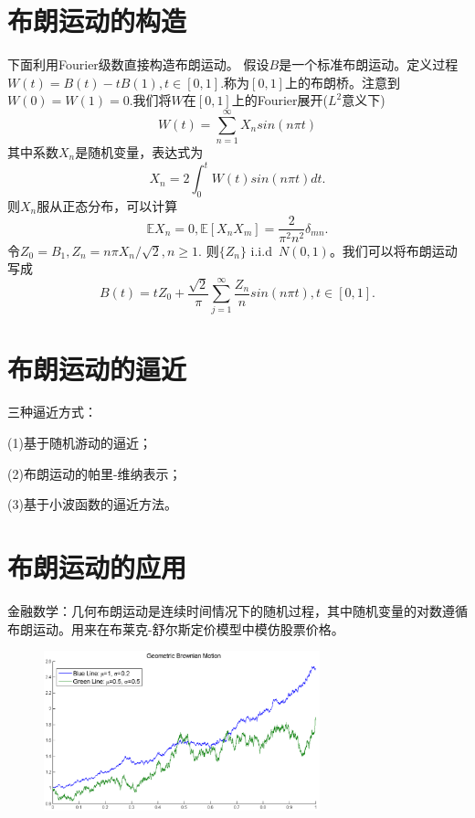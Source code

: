 \documentclass[UTF8]{ctexart}
\begin{document}
\section{布朗运动的构造}
下面利用Fourier级数直接构造布朗运动。 假设$B$是一个标准布朗运动。定义过程$W(t)=B(t)-tB(1),t\in[0,1]$.称为$[0,1]$上的布朗桥。注意到$W(0)=W(1)=0$.我们将$W$在$[0,1]$上的Fourier展开($L^2$意义下)
 \begin{equation}
 W(t)=\sum_{n=1}^{\infty}X_nsin(n\pi t)
 \end{equation}
 其中系数$X_n$是随机变量，表达式为
 \begin{equation}
 X_n=2\int_0^tW(t)sin(n\pi t)dt.
 \end{equation}
 则$X_n$服从正态分布，可以计算
 \begin{equation}
 \mathbb{E}X_n=0,\mathbb{E}[X_nX_m]=\frac{2}{\pi^2n^2}\delta_{mn}.
 \end{equation}
 令$Z_0=B_1,Z_n=n\pi X_n/\sqrt{2},n\ge1.$ 则$\{Z_n\}$ i.i.d~$N(0,1)$。我们可以将布朗运动写成
 \begin{equation}
 B(t)=tZ_0+\frac{\sqrt{2}}{\pi}\sum_{j=1}^{\infty}\frac{Z_n}{n}sin(n\pi t),t\in[0,1].
 \end{equation}


\section{布朗运动的逼近}
三种逼近方式：

(1)基于随机游动的逼近；

(2)布朗运动的帕里-维纳表示；

(3)基于小波函数的逼近方法。


\section{布朗运动的应用}
金融数学：几何布朗运动是连续时间情况下的随机过程，其中随机变量的对数遵循布朗运动。用来在布莱克-舒尔斯定价模型中模仿股票价格。
\begin{figure}[H]
  \centering
  \includegraphics[width=8cm]{images/17.png}\\
  \caption{}\label{fig15}
\end{figure}
\end{document}
